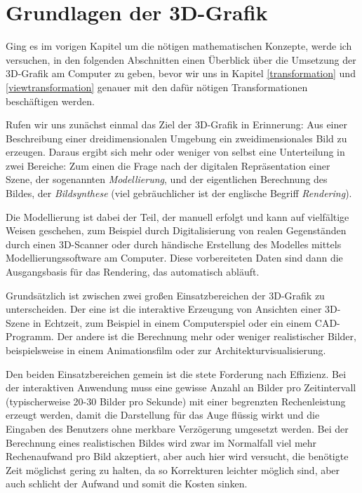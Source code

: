 \chapter{Grundlagen der 3D-Grafik}
Ging es im vorigen Kapitel um die nötigen mathematischen Konzepte, werde ich versuchen, in den folgenden Abschnitten einen Überblick über die Umsetzung der 3D-Grafik am Computer zu geben, bevor wir uns in Kapitel \ref{transformation} und \ref{viewtransformation} genauer mit den dafür nötigen Transformationen beschäftigen werden.

Rufen wir uns zunächst einmal das Ziel der 3D-Grafik in Erinnerung: Aus einer Beschreibung einer dreidimensionalen Umgebung ein zweidimensionales Bild zu erzeugen. Daraus ergibt sich mehr oder weniger von selbst eine Unterteilung in zwei Bereiche: Zum einen die Frage nach der digitalen Repräsentation einer Szene, der sogenannten \emph{Modellierung}, und der eigentlichen Berechnung des Bildes, der \emph{Bildsynthese} (viel gebräuchlicher ist der englische Begriff \emph{Rendering}).

Die Modellierung ist dabei der Teil, der manuell erfolgt und kann auf vielfältige Weisen geschehen, zum Beispiel durch Digitalisierung von realen Gegenständen durch einen 3D-Scanner oder durch händische Erstellung des Modelles mittels Modellierungssoftware am Computer. Diese vorbereiteten Daten sind dann die Ausgangsbasis für das Rendering, das automatisch abläuft.

Grundsätzlich ist zwischen zwei großen Einsatzbereichen der 3D-Grafik zu unterscheiden. Der eine ist die interaktive Erzeugung von Ansichten einer 3D-Szene in Echtzeit, zum Beispiel in einem Computerspiel oder ein einem CAD-Programm. Der andere ist die Berechnung mehr oder weniger realistischer Bilder, beispielsweise in einem Animationsfilm oder zur Architekturvisualisierung.

Den beiden Einsatzbereichen gemein ist die stete Forderung nach Effizienz. Bei der interaktiven Anwendung muss eine gewisse Anzahl an Bilder pro Zeitintervall (typischerweise 20-30 Bilder pro Sekunde) mit einer begrenzten Rechenleistung erzeugt werden, damit die Darstellung für das Auge flüssig wirkt und die Eingaben des Benutzers ohne merkbare Verzögerung umgesetzt werden. Bei der Berechnung eines realistischen Bildes wird zwar im Normalfall viel mehr Rechenaufwand pro Bild akzeptiert, aber auch hier wird versucht, die benötigte Zeit möglichst gering zu halten, da so Korrekturen leichter möglich sind, aber auch schlicht der Aufwand und somit die Kosten sinken.

